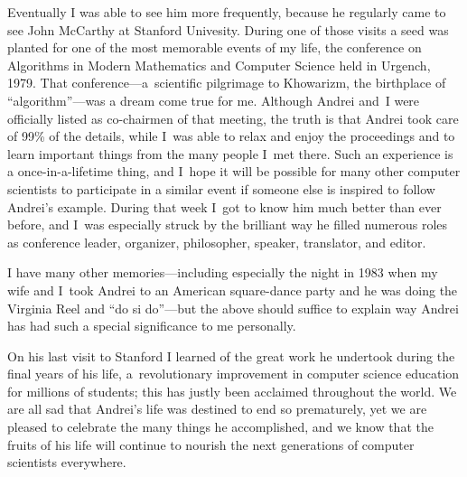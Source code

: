 Eventually I was able to see him more frequently, because he regularly
came to see John McCarthy at Stanford Univesity. During one of those
visits a seed was planted for one of the most memorable events of my
life, the conference on Algorithms in Modern Mathematics and Computer Science
held in Urgench, 1979. That conference---a~scientific pilgrimage to
Khowarizm, the birthplace of ``algorithm''---was a dream come true for me.
Although Andrei and~I were officially listed as co-chairmen of that meeting,
the truth is that Andrei took care of 99\% of the details, while I~was able
to relax and enjoy the proceedings and to learn important things from the many
people I~met there. 
Such an experience is a once-in-a-lifetime thing, and I~hope
it will be possible for many other computer scientists to participate
in a similar event if someone else is inspired to follow Andrei's example.
During that week I~got to know him much better than ever
before, and I~was especially struck by the brilliant way he filled numerous
roles as conference leader, organizer, philosopher, speaker, translator,
and editor. 

I have many other memories---including especially the night in 1983 when
my wife and I~took Andrei to an American square-dance party and he was
doing the Virginia Reel and ``do si do''---but the above should suffice
to explain way Andrei has had such a special significance to me personally.

On his last visit to Stanford I learned of the great work he undertook during 
the final years of his life, a~revolutionary improvement in computer science
education for millions of students; this has justly been acclaimed throughout
the world. We are all sad that Andrei's life was destined to end so 
prematurely, yet we are pleased to celebrate the many things he accomplished,
and we know that the fruits of his life will continue to nourish the
next generations of computer scientists everywhere.

\bye
